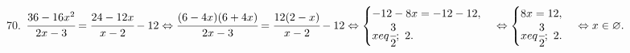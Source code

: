 70. $\cfrac{36-16x^2}{2x-3}=\cfrac{24-12x}{x-2}-12\Leftrightarrow
\cfrac{(6-4x)(6+4x)}{2x-3}=\cfrac{12(2-x)}{x-2}-12\Leftrightarrow
\begin{cases} -12-8x=-12-12,\\ x
eq\cfrac{3}{2};\ 2.\end{cases}\Leftrightarrow
\begin{cases} 8x=12,\\ x
eq\cfrac{3}{2};\ 2.\end{cases}\Leftrightarrow x\in\varnothing.$\\
